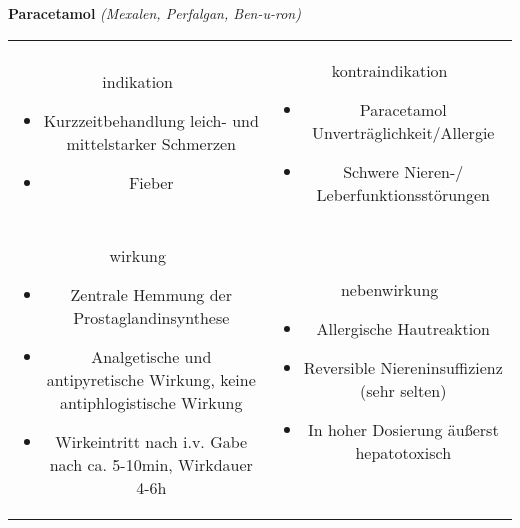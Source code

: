 \documentclass[12pt]{beamer}
\begin{document}
\begin{frame}{
    \textbf{Paracetamol}
    \textit{(Mexalen, Perfalgan, Ben-u-ron)}
}
    \begin{tabular}{c c}
        \begin{beamercolorbox}[wd=\boxwidth\textwidth,ht=\boxheight\textheight,sep=1em]{indikation}
            \begin{itemize}
                \item Kurzzeitbehandlung leich- und mittelstarker Schmerzen
                \item Fieber	
            \end{itemize}
        \end{beamercolorbox} & 
        \begin{beamercolorbox}[wd=\boxwidth\textwidth,ht=\boxheight\textheight,sep=1em]{kontraindikation}
            \begin{itemize}
                \item Paracetamol Unverträglichkeit/Allergie
                \item Schwere Nieren-/ Leberfunktionsstörungen
            \end{itemize}
        \end{beamercolorbox} \\
        \begin{beamercolorbox}[wd=\boxwidth\textwidth,ht=\boxheight\textheight,sep=1em]{wirkung}
            \scriptsize
            \begin{itemize}
                \item Zentrale Hemmung der Prostaglandinsynthese
                \item Analgetische und antipyretische Wirkung, keine antiphlogistische Wirkung
                \item Wirkeintritt nach i.v. Gabe nach ca. 5-10min, Wirkdauer 4-6h
            \end{itemize}
        \end{beamercolorbox} & 
        \begin{beamercolorbox}[wd=\boxwidth\textwidth,ht=\boxheight\textheight,sep=1em]{nebenwirkung}
            \begin{itemize}
                \item Allergische Hautreaktion
                \item Reversible Niereninsuffizienz (sehr selten)
                \item In hoher Dosierung äußerst hepatotoxisch
            \end{itemize}
        \end{beamercolorbox} \\
    \end{tabular}
\end{frame}
\end{document}

